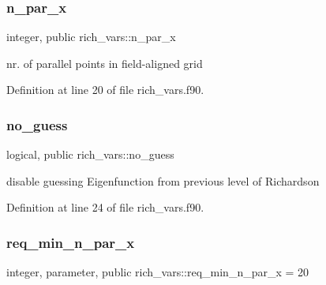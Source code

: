 \mbox{\label{namespacerich__vars_a7a32b8d53450cf925042cd5ddc7e23e6}} 
\subsubsection{\texorpdfstring{n\+\_\+par\+\_\+x}{n\_par\_x}}
{\footnotesize\ttfamily integer, public rich\+\_\+vars\+::n\+\_\+par\+\_\+x}



nr. of parallel points in field-\/aligned grid 



Definition at line 20 of file rich\+\_\+vars.\+f90.

\mbox{\label{namespacerich__vars_a167fe55b5d9c1a4566729da683466947}} 
\subsubsection{\texorpdfstring{no\+\_\+guess}{no\_guess}}
{\footnotesize\ttfamily logical, public rich\+\_\+vars\+::no\+\_\+guess}



disable guessing Eigenfunction from previous level of Richardson 



Definition at line 24 of file rich\+\_\+vars.\+f90.

\mbox{\label{namespacerich__vars_a94e61b5125377ab3e984334998f5ebae}} 
\subsubsection{\texorpdfstring{req\+\_\+min\+\_\+n\+\_\+par\+\_\+x}{req\_min\_n\_par\_x}}
{\footnotesize\ttfamily integer, parameter, public rich\+\_\+vars\+::req\+\_\+min\+\_\+n\+\_\+par\+\_\+x = 20}




